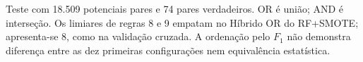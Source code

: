 \begin{table}[htbp]
\par\footnotesize Teste com 18.509 potenciais pares e 74 pares verdadeiros. OR é união; AND é interseção. Os limiares de regras 8 e 9 empatam no Híbrido OR do RF+SMOTE; apresenta-se 8, como na validação cruzada. A ordenação pelo $F_1$ não demonstra diferença entre as dez primeiras configurações nem equivalência estatística.
\end{table}
